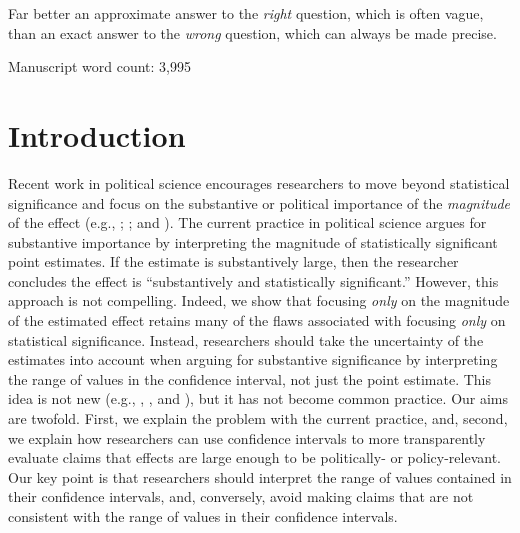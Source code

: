 \documentclass[12pt]{article}
\begin{document}
\epigraph{Far better an approximate answer to the \textit{right} question, which is often vague, than an exact answer to the \textit{wrong} question, which can always be made precise.}{\citet[pp. 13-14]{Tukey1962}}

\begin{center}
Manuscript word count: 3,995
\end{center}

\thispagestyle{empty}

\newpage
\doublespace

\section*{Introduction}

Recent work in political science encourages researchers to move beyond statistical significance and focus on the substantive or political importance of the \emph{magnitude} of the effect (e.g., \citealt{KingTomzWittenberg2000}; \citealt{HanmerKalkan2013}; and \citealt{EsareyDanneman2014}). The current practice in political science argues for substantive importance by interpreting the magnitude of statistically significant point estimates. If the estimate is substantively large, then the researcher concludes the effect is ``substantively and statistically significant.'' However, this approach is not compelling. Indeed, we show that focusing \emph{only} on the magnitude of the estimated effect retains many of the flaws associated with focusing \emph{only} on statistical significance. Instead, researchers should take the uncertainty of the estimates into account when arguing for substantive significance by interpreting the range of values in the confidence interval, not just the point estimate. This idea is not new (e.g., \citealt{Achen1982}, \citealt{Gross2014}, and \citealt{Rainey2014a}), but it has not become common practice. Our aims are twofold. First, we explain the problem with the current practice, and, second, we explain how researchers can use confidence intervals to more transparently evaluate claims that effects are large enough to be politically- or policy-relevant. Our key point is that researchers should interpret the range of values contained in their confidence intervals, and, conversely, avoid making claims that are not consistent with the range of values in their confidence intervals.
\end{document}
